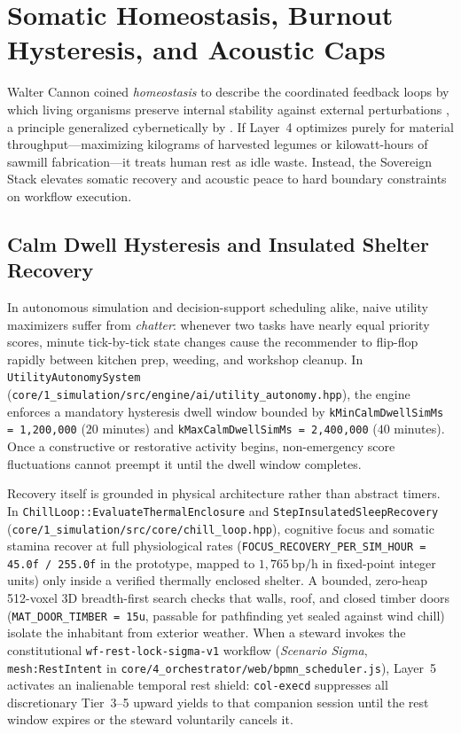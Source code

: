 \section{Somatic Homeostasis, Burnout Hysteresis, and Acoustic Caps}
\label{sec:homeostasis-and-acoustic-caps}

Walter Cannon coined \emph{homeostasis} to describe the coordinated feedback loops by which living organisms preserve internal stability against external perturbations \parencite{cannon1932}, a principle generalized cybernetically by \textcite{ashby1952}. If Layer~4 optimizes purely for material throughput---maximizing kilograms of harvested legumes or kilowatt-hours of sawmill fabrication---it treats human rest as idle waste. Instead, the Sovereign Stack elevates somatic recovery and acoustic peace to hard boundary constraints on workflow execution.

\subsection{Calm Dwell Hysteresis and Insulated Shelter Recovery}

In autonomous simulation and decision-support scheduling alike, naive utility maximizers suffer from \emph{chatter}: whenever two tasks have nearly equal priority scores, minute tick-by-tick state changes cause the recommender to flip-flop rapidly between kitchen prep, weeding, and workshop cleanup. In \texttt{UtilityAutonomySystem} (\texttt{core/1\_simulation/src/engine/ai/utility\_autonomy.hpp}), the engine enforces a mandatory hysteresis dwell window bounded by \texttt{kMinCalmDwellSimMs = 1,200,000} ($20$ minutes) and \texttt{kMaxCalmDwellSimMs = 2,400,000} ($40$ minutes). Once a constructive or restorative activity begins, non-emergency score fluctuations cannot preempt it until the dwell window completes.

Recovery itself is grounded in physical architecture rather than abstract timers. In \texttt{ChillLoop::EvaluateThermalEnclosure} and \texttt{StepInsulatedSleepRecovery} (\texttt{core/1\_simulation/src/core/chill\_loop.hpp}), cognitive focus and somatic stamina recover at full physiological rates (\texttt{FOCUS\_RECOVERY\_PER\_SIM\_HOUR = 45.0f / 255.0f} in the prototype, mapped to $1{,}765\,\text{bp/h}$ in fixed-point integer units) only inside a verified thermally enclosed shelter. A bounded, zero-heap 512-voxel 3D breadth-first search checks that walls, roof, and closed timber doors (\texttt{MAT\_DOOR\_TIMBER = 15u}, passable for pathfinding yet sealed against wind chill) isolate the inhabitant from exterior weather. When a steward invokes the constitutional \texttt{wf-rest-lock-sigma-v1} workflow (\emph{Scenario Sigma}, \texttt{mesh:RestIntent} in \texttt{core/4\_orchestrator/web/bpmn\_scheduler.js}), Layer~5 activates an inalienable temporal rest shield: \texttt{col-execd} suppresses all discretionary Tier~3--5 upward yields to that companion session until the rest window expires or the steward voluntarily cancels it.

